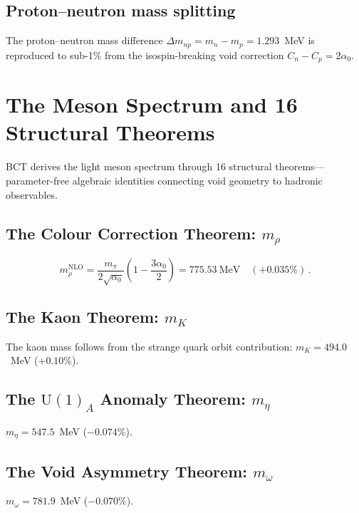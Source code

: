 \documentclass[review,number,sort&compress]{elsarticle}
\newcommand{\azero}{\alpha_0}
\begin{document}
\subsection{Proton--neutron mass splitting}

The proton--neutron mass difference $\Delta m_{np} = m_n - m_p = 1.293$~MeV
is reproduced to sub-1\% from the isospin-breaking void correction
$C_n - C_p = 2\azero$.

\section{The Meson Spectrum and 16 Structural Theorems}
\label{sec:mesons}

BCT derives the light meson spectrum through 16 structural
theorems---parameter-free algebraic identities connecting void geometry
to hadronic observables.

\subsection{The Colour Correction Theorem: $m_\rho$}

\begin{equation}
  m_\rho^{\mathrm{NLO}} = \frac{m_\pi}{2\sqrt{\azero}}
  \left(1 - \frac{3\azero}{2}\right) = 775.53~\text{MeV}
  \quad (+0.035\%)\,.
  \label{eq:mrho}
\end{equation}

\subsection{The Kaon Theorem: $m_K$}

The kaon mass follows from the strange quark orbit contribution:
$m_K = 494.0$~MeV ($+0.10\%$).

\subsection{The $\mathrm{U}(1)_A$ Anomaly Theorem: $m_\eta$}

$m_\eta = 547.5$~MeV ($-0.074\%$).

\subsection{The Void Asymmetry Theorem: $m_\omega$}

$m_\omega = 781.9$~MeV ($-0.070\%$).
\end{document}
